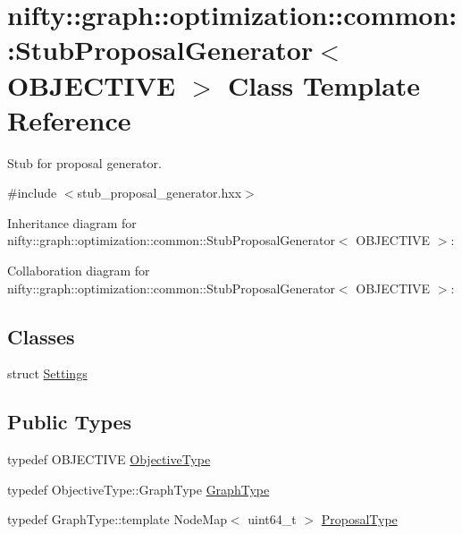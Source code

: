 \hypertarget{classnifty_1_1graph_1_1optimization_1_1common_1_1StubProposalGenerator}{}\section{nifty\+:\+:graph\+:\+:optimization\+:\+:common\+:\+:Stub\+Proposal\+Generator$<$ O\+B\+J\+E\+C\+T\+I\+V\+E $>$ Class Template Reference}
\label{classnifty_1_1graph_1_1optimization_1_1common_1_1StubProposalGenerator}


Stub for proposal generator.  




{\ttfamily \#include $<$stub\+\_\+proposal\+\_\+generator.\+hxx$>$}



Inheritance diagram for nifty\+:\+:graph\+:\+:optimization\+:\+:common\+:\+:Stub\+Proposal\+Generator$<$ O\+B\+J\+E\+C\+T\+I\+V\+E $>$\+:


Collaboration diagram for nifty\+:\+:graph\+:\+:optimization\+:\+:common\+:\+:Stub\+Proposal\+Generator$<$ O\+B\+J\+E\+C\+T\+I\+V\+E $>$\+:
\subsection*{Classes}
\begin{DoxyCompactItemize}
\item 
struct \hyperlink{structnifty_1_1graph_1_1optimization_1_1common_1_1StubProposalGenerator_1_1Settings}{Settings}
\end{DoxyCompactItemize}
\subsection*{Public Types}
\begin{DoxyCompactItemize}
\item 
typedef O\+B\+J\+E\+C\+T\+I\+V\+E \hyperlink{classnifty_1_1graph_1_1optimization_1_1common_1_1StubProposalGenerator_ae7d0ffc1c09e62f40d0dbee2ae7ae5d7}{Objective\+Type}
\item 
typedef Objective\+Type\+::\+Graph\+Type \hyperlink{classnifty_1_1graph_1_1optimization_1_1common_1_1StubProposalGenerator_ad5d7c98b50ccddc5ce4fbd83b2ca3214}{Graph\+Type}
\item 
typedef Graph\+Type\+::template Node\+Map$<$ uint64\+\_\+t $>$ \hyperlink{classnifty_1_1graph_1_1optimization_1_1common_1_1StubProposalGenerator_a1be02f6d87cf6bf34ee078b367d40538}{Proposal\+Type}
\end{DoxyCompactItemize}
